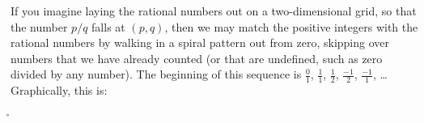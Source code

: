 \documentclass[letterpaper,11pt,showproblems]{pset}
\theoremstyle{definition} \newtheorem{defn}{Definition}[section]
\theoremstyle{definition} \newtheorem*{defn*}{Definition}
\begin{document}
  If you imagine laying the rational numbers out on a two-dimensional grid, so that the number $p / q$ falls at $(p, q)$, then we may match the positive integers with the rational numbers by walking in a spiral pattern out from zero, skipping over numbers that we have already counted (or that are undefined, such as zero divided by any number).  The beginning of this sequence is $\frac01$, $\frac11$, $\frac12$, $\frac{-1}{2}$, $\frac{-1}{1}$, \ldots  Graphically, this is:
  \begin{center}
    \makeatletter
    \newcount\m
    \newcount\n
    \newcount\q
    \newcount\r
    \def\fullexpand#1{{\edef\@temp{#1}\expandafter}\@temp}
    \newcommand{\@gcd}[2]{{%
      \m=#1 \n=#2
      \ifnum\m=0
        \ifnum\n=0
          \expandafter\xdef\csname gcd\the\m, \the\n\endcsname{\infty}%
        \else
          \expandafter\xdef\csname gcd\the\m, \the\n\endcsname{\the\n}%
        \fi
      \else
        \ifnum\n=0
          \expandafter\xdef\csname gcd\the\m, \the\n\endcsname{\the\m}%
        \else
          \ifnum\m<0
            \ifnum\n<0
              \@gcd{-\the\m}{-\the\n}%
              \expandafter\xdef\csname gcd\the\m, \the\n\endcsname{-\csname gcd\expandafter\@gobble\the\m, \expandafter\@gobble\the\n\endcsname}%
            \else
              \@gcd{-\the\m}{\the\n}%
              \expandafter\xdef\csname gcd\the\m, \the\n\endcsname{\csname gcd\expandafter\@gobble\the\m, \the\n\endcsname}%
            \fi
          \else
            \ifnum\n<0
              \@gcd{\the\m}{-\the\n}%
              \expandafter\xdef\csname gcd\the\m, \the\n\endcsname{-\csname gcd\the\m, \expandafter\@gobble\the\n\endcsname}%
            \else
              \q = \m  \divide\q by \n %
              \r = \q  \multiply\r by -\n \advance\r by \m %
              \@gcd{\the\n}{\the\r}%
              \expandafter\xdef\csname gcd\the\m, \the\n\endcsname{\csname gcd\the\n, \the\r\endcsname}%
            \fi
          \fi
        \fi
      \fi
    }}
    \newcommand{\ifgcdone}[2]{%
      {\@gcd{#1}{#2}\expandafter}%
      \ifnum\csname gcd#1, #2\endcsname=1
        \expandafter\@firstoftwo
      \else
        \expandafter\@secondoftwo
      \fi
    }
    \makeatother
    \def\arrowcolor{green}
    \def\arrowoffset{0.33}
    \begin{tikzpicture}[line cap=round,line join=round,>=triangle 45,x=1cm,y=1cm]

\end{tikzpicture}
\end{center}
\end{document}
